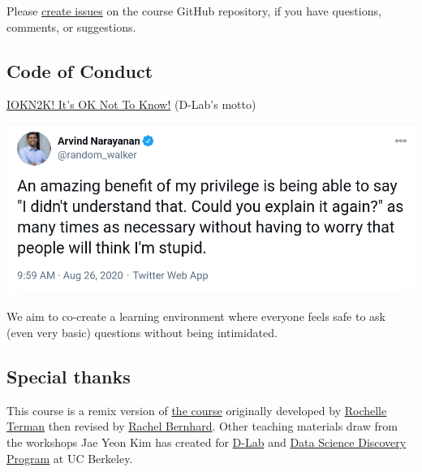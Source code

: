 \documentclass[
]{article}
\begin{document}
Please \href{https://github.com/PS239T/spring_2021/issues}{create
issues} on the course GitHub repository, if you have questions,
comments, or suggestions.

\hypertarget{code-of-conduct}{%
\subsection{Code of Conduct}\label{code-of-conduct}}

\href{https://dlab.berkeley.edu/blog/what-iokn2k}{IOKN2K! It's OK Not To
Know!} (D-Lab's motto)

\includegraphics{tweet_screenshot.png}

We aim to co-create a learning environment where everyone feels safe to
ask (even very basic) questions without being intimidated.

\hypertarget{special-thanks}{%
\subsection{Special thanks}\label{special-thanks}}

This course is a remix version of
\href{https://github.com/rochelleterman/PS239T}{the course} originally
developed by \href{http://rochelleterman.com/}{Rochelle Terman} then
revised by \href{http://rachelbernhard.com/}{Rachel Bernhard}. Other
teaching materials draw from the workshops Jae Yeon Kim has created for
\href{https://dlab.berkeley.edu/}{D-Lab} and
\href{https://data.berkeley.edu/research/discovery-program-home}{Data
Science Discovery Program} at UC Berkeley.
\end{document}
